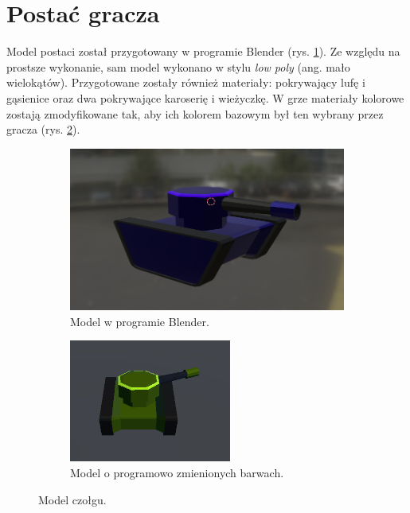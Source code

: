 \section{Postać gracza}
Model postaci został przygotowany w programie Blender (rys. \ref{fig:model}). Ze względu na prostsze wykonanie, sam model wykonano w stylu \emph{low poly} (ang. mało wielokątów). Przygotowane zostały również materiały: pokrywający lufę i gąsienice oraz dwa pokrywające karoserię i wieżyczkę. W grze materiały kolorowe zostają zmodyfikowane tak, aby ich kolorem bazowym był ten wybrany przez gracza (rys. \ref{fig:model_green}).

\begin{figure}
\centering
    \begin{subfigure}{.7\textwidth}
        \centering
        \includegraphics[width=.8\linewidth]{Images/development/model.png}
        \caption{Model w programie Blender.}
        \label{fig:model}
    \end{subfigure}
    
    \begin{subfigure}{.7\textwidth}
        \centering
        \includegraphics[width=.8\linewidth]{Images/development/model_green.png}
        \caption{Model o programowo zmienionych barwach.}
        \label{fig:model_green}
    \end{subfigure}
    \caption{Model czołgu.}
    \label{fig:both_models}
\end{figure}



